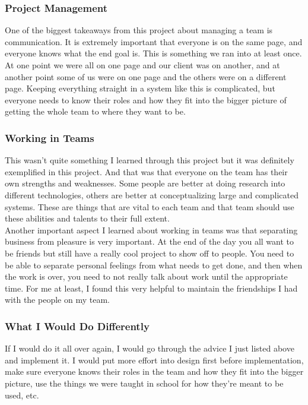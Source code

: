 \documentclass[letterpaper,10pt,titlepage,draftclsnofoot,onecolumn,onesided] {IEEEtran}
\begin{document}
\subsubsection{Project Management}
One of the biggest takeaways from this project about managing a team is communication.
It is extremely important that everyone is on the same page, and everyone knows what the end goal is.
This is something we ran into at least once.
At one point we were all on one page and our client was on another, and at another point some of us were on one page and the others were on a different page.
Keeping everything straight in a system like this is complicated, but everyone needs to know their roles and how they fit into the bigger picture of getting the whole team to where they want to be.\\

\subsubsection{Working in Teams}
This wasn't quite something I learned through this project but it was definitely exemplified in this project.
And that was that everyone on the team has their own strengths and weaknesses.
Some people are better at doing research into different technologies, others are better at conceptualizing large and complicated systems.
These are things that are vital to each team and that team should use these abilities and talents to their full extent. \\

Another important aspect I learned about working in teams was that separating business from pleasure is very important. 
At the end of the day you all want to be friends but still have a really cool project to show off to people.
You need to be able to separate personal feelings from what needs to get done, and then when the work is over, you need to not really talk about work until the appropriate time.
For me at least, I found this very helpful to maintain the friendships I had with the people on my team.\\

\subsubsection{What I Would Do Differently}
If I would do it all over again, I would go through the advice I just listed above and implement it.
I would put more effort into design first before implementation, make sure everyone knows their roles in the team and how they fit into the bigger picture, use the things we were taught in school for how they're meant to be used, etc. 
\end{document}
